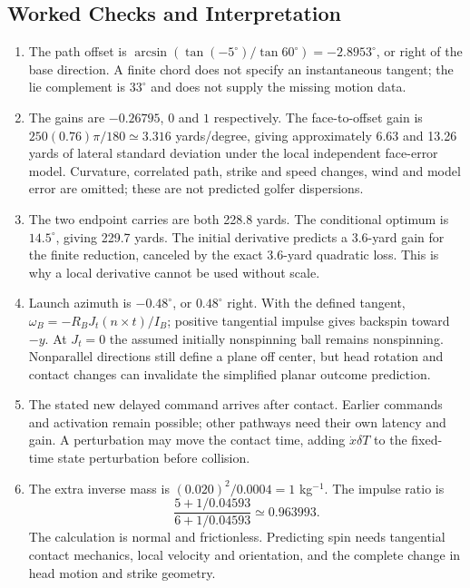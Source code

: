 \subsection{Worked Checks and Interpretation}

\begin{enumerate}[leftmargin=*]
\item The path offset is
$\arcsin(\tan(-5^\circ)/\tan60^\circ)=-2.8953^\circ$, or right of the
base direction. A finite chord does not specify an instantaneous tangent;
the lie complement is $33^\circ$ and does not supply the missing motion data.

\item The gains are $-0.26795$, $0$ and $1$ respectively. The face-to-offset
gain is $250(0.76)\pi/180\simeq3.316$ yards/degree, giving approximately
6.63 and 13.26 yards of lateral standard deviation under the local independent
face-error model. Curvature, correlated path, strike and speed changes,
wind and model error are omitted; these are not predicted golfer dispersions.

\item The two endpoint carries are both 228.8 yards. The conditional
optimum is $14.5^\circ$, giving 229.7 yards. The initial derivative predicts
a 3.6-yard gain for the finite reduction, canceled by the exact 3.6-yard
quadratic loss. This is why a local derivative cannot be used without scale.

\item Launch azimuth is $-0.48^\circ$, or $0.48^\circ$ right. With the
defined tangent, $\omega_B=-R_BJ_t(n\times t)/I_B$; positive tangential
impulse gives backspin toward $-y$. At $J_t=0$ the assumed initially
nonspinning ball remains nonspinning. Nonparallel directions still define
a plane off center, but head rotation and contact changes can invalidate
the simplified planar outcome prediction.

\item The stated new delayed command arrives after contact. Earlier
commands and activation remain possible; other pathways need their own
latency and gain. A perturbation may move the contact time, adding
$\dot x\delta T$ to the fixed-time state perturbation before collision.

\item The extra inverse mass is $(0.020)^2/0.0004=1$ kg$^{-1}$.
The impulse ratio is
\[
\frac{5+1/0.04593}{6+1/0.04593}\simeq0.963993.
\]
The calculation is normal and frictionless. Predicting spin needs tangential
contact mechanics, local velocity and orientation, and the complete change
in head motion and strike geometry.


\end{enumerate}
